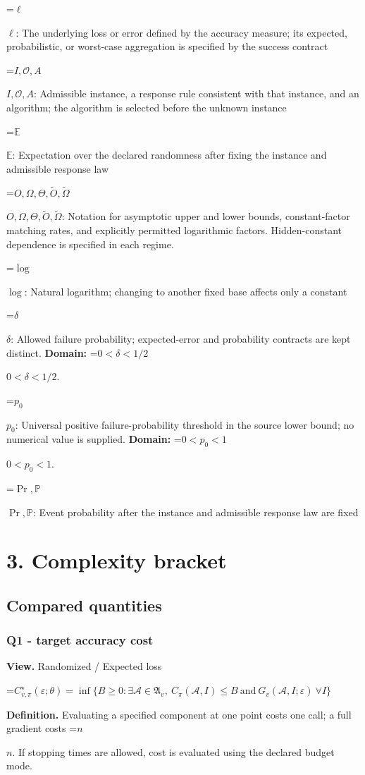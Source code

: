 \documentclass[10pt,a4paper]{article}
\newcommand{\AtlasMath}[1]{\par\begingroup\centering\setbox0=\hbox{$\displaystyle #1$}\ifdim\wd0>1.4\linewidth\typeout{ATLAS WIDE FORMULA: \the\wd0}\fi\ifdim\wd0>\linewidth\resizebox{\linewidth}{!}{\box0}\else\box0\fi\par\endgroup}
\newcommand{\AtlasInlineMath}[1]{\begingroup\setbox0=\hbox{$#1$}\ifdim\wd0>.4\linewidth\endgroup\AtlasMath{#1}\else\endgroup$#1$\fi}
\begin{document}
\AtlasInlineMath{\ell}: The underlying loss or error defined by the accuracy measure; its expected, probabilistic, or worst-case aggregation is specified by the success contract

\AtlasInlineMath{I,\mathcal{O},A}: Admissible instance, a response rule consistent with that instance, and an algorithm; the algorithm is selected before the unknown instance

\AtlasInlineMath{\mathbb{E}}: Expectation over the declared randomness after fixing the instance and admissible response law

\AtlasInlineMath{O,\Omega,\Theta,\widetilde{O},\widetilde\Omega}: Notation for asymptotic upper and lower bounds, constant-factor matching rates, and explicitly permitted logarithmic factors. Hidden-constant dependence is specified in each regime.

\AtlasInlineMath{\log}: Natural logarithm; changing to another fixed base affects only a constant

\AtlasInlineMath{\delta}: Allowed failure probability; expected-error and probability contracts are kept distinct. \textbf{Domain:} \AtlasInlineMath{0<\delta<1/2}.

\AtlasInlineMath{p_0}: Universal positive failure-probability threshold in the source lower bound; no numerical value is supplied. \textbf{Domain:} \AtlasInlineMath{0<p_0<1}.

\AtlasInlineMath{\Pr,\mathbb{P}}: Event probability after the instance and admissible response law are fixed

\section{3. Complexity bracket}
\subsection{Compared quantities}
\subsubsection{Q1 - target accuracy cost}
\textbf{View.} Randomized / Expected loss

\AtlasMath{C^\star_{v,\pi}(\varepsilon;\theta)=\inf\{B\ge0:\exists\mathcal A\in\mathfrak A_v,\ C_\pi(\mathcal A,I)\le B\ \text{and}\ G_v(\mathcal A,I;\varepsilon)\ \forall I\}}
\textbf{Definition.} Evaluating a specified component at one point costs one call; a full gradient costs \AtlasInlineMath{n}. If stopping times are allowed, cost is evaluated using the declared budget mode.
\end{document}
